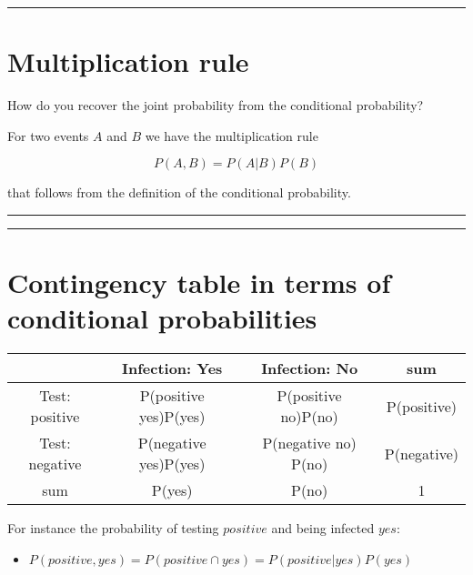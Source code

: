 \documentclass[
]{book}
\providecommand{\tightlist}{%
  \setlength{\itemsep}{0pt}\setlength{\parskip}{0pt}}
\begin{document}
\begin{center}\rule{0.5\linewidth}{0.5pt}\end{center}

\hypertarget{multiplication-rule-1}{%
\section{Multiplication rule}\label{multiplication-rule-1}}

How do you recover the joint probability from the conditional probability?

For two events \(A\) and \(B\) we have the multiplication rule

\[P(A, B) =  P(A|B) P(B)\]

that follows from the definition of the conditional probability.

\begin{center}\rule{0.5\linewidth}{0.5pt}\end{center}

\begin{center}\rule{0.5\linewidth}{0.5pt}\end{center}

\hypertarget{contingency-table-in-terms-of-conditional-probabilities}{%
\section{Contingency table in terms of conditional probabilities}\label{contingency-table-in-terms-of-conditional-probabilities}}

\begin{longtable}[]{@{}cccc@{}}
\toprule
& Infection: Yes & Infection: No & sum \\
\midrule
\endhead
Test: positive & P(positive {\textbar{}} yes)P(yes) & P(positive {\textbar{}} no)P(no) & P(positive) \\
Test: negative & P(negative {\textbar{}} yes)P(yes) & P(negative {\textbar{}} no) P(no) & P(negative) \\
sum & P(yes) & P(no) & 1 \\
\bottomrule
\end{longtable}

For instance the probability of testing \(positive\) and being infected \(yes\):

\begin{itemize}
\tightlist
\item
  \(P(positive, yes)=P(positive \cap yes) = P(positive|yes) P(yes)\)
\end{itemize}
\end{document}
